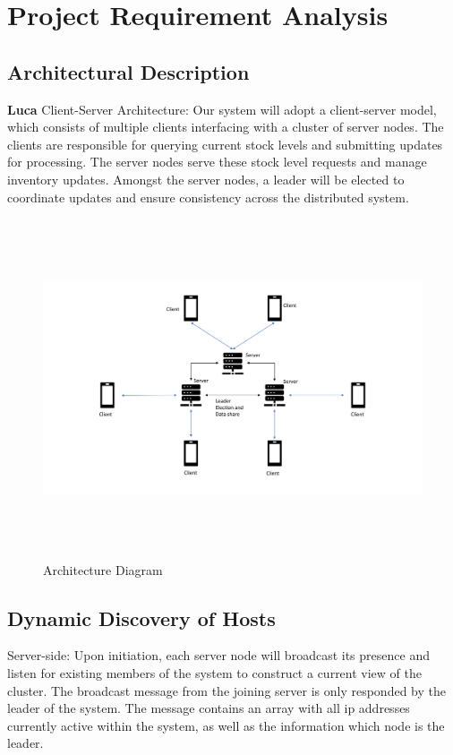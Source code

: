 \chapter{Project Requirement Analysis}\label{ch:ProjectRequirementAnalysis}
\section{Architectural Description}\label{sec:ArchitecturalDescription}
\textbf{Luca}
Client-Server Architecture: Our system will adopt a client-server model, which consists of multiple clients interfacing with a cluster of server nodes. The clients are responsible for querying current stock levels and submitting updates for processing. The server nodes serve these stock level requests and manage inventory updates. Amongst the server nodes, a leader will be elected to coordinate updates and ensure consistency across the distributed system.

\begin{figure}[h!]
        \includegraphics[height=10cm, width=18cm]{images/Architecture.png}
        \caption{Architecture Diagram}
        \label{fig:architecture}
\end{figure}


\section{Dynamic Discovery of Hosts}\label{sec:DynamicDiscoveryOfHosts}
Server-side: Upon initiation, each server node will broadcast its presence and listen for existing members of the system to construct a current view of the cluster. The broadcast message from the joining server is only responded by the
leader of the system. The message contains an array with all ip addresses currently active within the system, as well as the information which node is the leader.

